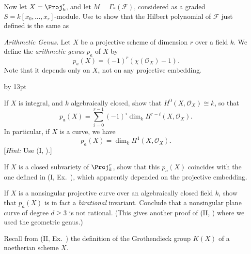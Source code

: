 {{{\noindent\hypertarget{ex-III-5.2b}{}Now let $X=\Proj_k^r$, and let $M=\Gamma_*(\mathcal F)$, considered as a graded $S=k[x_0,\ldots,x_r]$-module. Use  to show that the Hilbert polynomial of $\mathcal F$ just defined is the same as
\par}

\smallskip
\noindent\hypertarget{ex-III-5.3}{}\emph{Arithmetic Genus.} Let $X$ be a projective scheme of dimension $r$ over a field $k$. We define the \emph{arithmetic genus} $p_a$ of $X$ by
\[
p_a(X)=(-1)^r(\chi(\mathcal O_X)-1).
\]
Note that it depends only on $X$, not on any projective embedding.
{\advance\leftskip by 13pt\par
\noindent\hypertarget{ex-III-5.3a}{}If $X$ is integral, and $k$ algebraically closed, show that $H^0(X,\mathcal O_X)\cong k$, so that
\[
p_a(X)=\sum_{i=0}^{r-1}(-1)^i\dim_kH^{r-i}(X,\mathcal O_X).
\]
In particular, if $X$ is a curve, we have
\[
p_a(X)=\dim_kH^1(X,\mathcal O_X).
\]
[\emph{Hint:} Use (I, ).]

\noindent\hypertarget{ex-III-5.3b}{}If $X$ is a closed subvariety of $\Proj_k^r$, show that this $p_a(X)$ coincides with the one defined in (I, Ex.~), which apparently depended on the projective embedding.

\noindent\hypertarget{ex-III-5.3c}{}If $X$ is a nonsingular projective curve over an algebraically closed field $k$, show that $p_a(X)$ is in fact a \emph{birational} invariant. Conclude that a nonsingular plane curve of degree $d\geq3$ is not rational. (This gives another proof of (II, ) where we used the geometric genus.)\par}

\smallskip
\noindent\hypertarget{ex-III-5.4}{}Recall from (II, Ex.~) the definition of the Grothendieck group $K(X)$ of a noetherian scheme $X$.\par}
}
